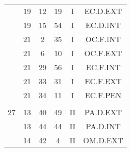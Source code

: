 \documentclass[12pt, a4paper]{article}
\begin{document}
\begin{multicols}{3}
{\begin{tabular}{c c c c c c}
	 	 	 	 & 19 & 12 & 19 & I & EC.D.EXT\\%
	 	 	 	 & 19 & 15 & 54 & I & EC.D.INT\\%
	 	 	 	 & 21 & 2 & 35 & I & OC.F.INT\\%
	 	 	 	 & 21 & 6 & 10 & I & OC.F.EXT\\%
	 	 	 	 & 21 & 29 & 56 & I & EC.F.INT\\%
	 	 	 	 & 21 & 33 & 31 & I & EC.F.EXT\\%
	 	 	 	 & 21 & 34 & 11 & I & EC.F.PEN\\%
	 	 	 	 & & & & & \\%
	 	 	 	27 & 13 & 40 & 49 & II & PA.D.EXT\\%
	 	 	 	 & 13 & 44 & 44 & II & PA.D.INT\\%
	 	 	 	 & 14 & 42 & 4 & II & OM.D.EXT\\%
	 	 \end{tabular}
 	}
\end{multicols}
\end{document}
